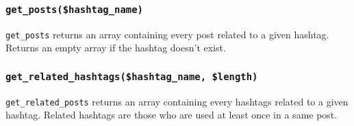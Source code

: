 \documentclass[twoside,a4paper,12pt]{article}
\begin{document}
\subsubsection{\texttt{get\_posts(\$hashtag\_name)}}
\texttt{get\_posts} returns an array containing every post related to a given hashtag. Returns an empty array if the hashtag doesn't exist.

\subsubsection{\texttt{get\_related\_hashtags(\$hashtag\_name, \$length)}}
\texttt{get\_related\_posts} returns an array containing every hashtags related to a given hashtag. Related hashtags are those who are used at least once in a same post.
\end{document}
